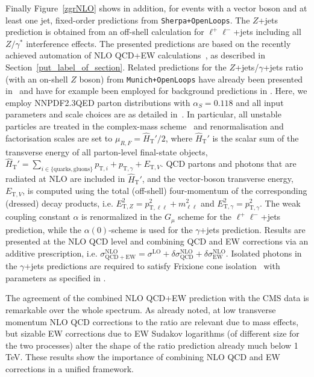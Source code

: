 \documentclass[11pt]{cernrep} \usepackage{graphicx,epsfig} 
\begin{document}
Finally Figure~\ref{zgrNLO} shows in addition, for events with a vector boson and at least one
jet, fixed-order predictions from {\tt Sherpa+OpenLoops}. The $Z$+jets prediction
is obtained from an off-shell calculation for $\ell^+\ell^-$+jets including all $Z/\gamma^*$ interference effects.
The presented predictions are based on the recently 
achieved automation of NLO QCD+EW 
calculations~\cite{Kallweit:2014xda,Kallweit:2015dum}, as described in 
Section~\ref{put_label_of_section}. Related predictions for the $Z$+jets/$\gamma$+jets 
ratio (with an on-shell $Z$ boson) from {\tt Munich+OpenLoops} have already been presented 
in~\cite{Kallweit:2015fta} and have for example been employed for background 
predictions in \cite{CMS:2015jdt}. Here, we employ NNPDF2.3QED \cite{Ball:2013hta} 
parton distributions with $\alpha_S=0.118$ and all input parameters and scale 
choices are as detailed in~\cite{Kallweit:2015dum}. In particular, all unstable 
particles are treated in the complex-mass scheme~\cite{Denner:2005fg} and  
renormalisation and factorisation scales are set to 
$\mu_{R,F}=\hat{H}_{\mathrm{T}}'/2$, where $\hat{H}_{\mathrm{T}}'$ is the scalar 
sum of the transverse energy of all parton-level final-state objects, 
$\hat{H}_{\mathrm{T}}' = \sum_{i\in \{\mathrm{quarks,gluons}\}} p_{\mathrm{T},i} 
+ p_{\mathrm{T},\gamma} + E_{\mathrm{T}, V}$. QCD partons and photons that are 
radiated at NLO are included in $\hat{H}_{\mathrm{T}}'$, and the vector-boson 
transverse energy, $E_{\mathrm{T},V}$,  is computed using the total (off-shell) 
four-momentum of the corresponding (dressed) decay products, i.e. 
$E^2_{\mathrm{T},Z}=p^2_{\mathrm{T},\ell\ell}+m_{\ell\ell}^2$ and 
$E^2_{\mathrm{T},\gamma}=p_{\mathrm{T},\gamma}^2$. The weak coupling constant 
$\alpha$ is renormalized in the $G_{\mu}$ scheme for the $\ell^+\ell^-$+jets prediction, 
while the $\alpha(0)$-scheme is used for the $\gamma$+jets prediction. Results 
are presented at the NLO QCD level and combining QCD and EW corrections via an 
additive prescription, i.e. $\sigma^{\mathrm{NLO}}_{\mathrm{QCD+EW}} =
\sigma^{\mathrm{LO}}+\delta\sigma^{\mathrm{NLO}}_{\mathrm{QCD}} + 
\delta\sigma^{\mathrm{NLO}}_{\mathrm{EW}}$. Isolated photons in the $\gamma$+jets 
predictions are required to satisfy Frixione cone isolation~\cite{Frixione} with parameters
as specified in \cite{Khachatryan:2015ira}.

The agreement of the combined NLO QCD+EW prediction with the CMS data is
remarkable over the whole spectrum. As already noted, at low transverse momentum
NLO QCD corrections to the ratio are relevant due to mass effects, but sizable
EW corrections due to EW Sudakov logarithms (of different size for the two
processes) alter the shape of the ratio prediction already much below 1 TeV.
These results show the importance of combining NLO QCD and EW corrections in a
unified framework.



\end{document}
